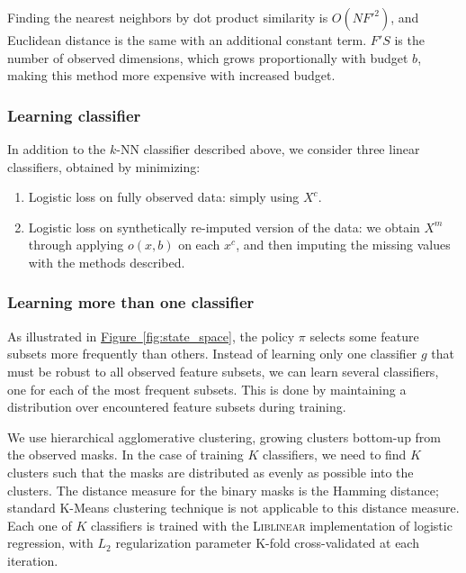 Finding the nearest neighbors by dot product similarity is $O(NF'^2)$, and Euclidean distance is the same with an additional constant term.
$F'S$ is the number of observed dimensions, which grows proportionally with budget $b$, making this method more expensive with increased budget.

\subsubsection{Learning classifier}


In addition to the $k$-NN classifier described above, we consider three linear classifiers, obtained by minimizing:
\begin{enumerate}
  \item Logistic loss on fully observed data: simply using $X^c$.
  \item Logistic loss on synthetically re-imputed version of the data: we obtain $X^m$ through applying $o(x, b)$ on each $x^c$, and then imputing the missing values with the methods described.
\end{enumerate}

\subsubsection{Learning more than one classifier}

As illustrated in \hyperref[fig:state_space]{Figure~\ref*{fig:state_space}}, the policy $\pi$ selects some feature subsets more frequently than others.
Instead of learning only one classifier $g$ that must be robust to all observed feature subsets, we can learn several classifiers, one for each of the most frequent subsets.
This is done by maintaining a distribution over encountered feature subsets during training.

We use hierarchical agglomerative clustering, growing clusters bottom-up from the observed masks.
In the case of training $K$ classifiers, we need to find $K$ clusters such that the masks are distributed as evenly as possible into the clusters.
The distance measure for the binary masks is the Hamming distance; standard K-Means clustering technique is not applicable to this distance measure.
Each one of $K$ classifiers is trained with the \textsc{Liblinear} implementation of logistic regression, with $L_2$ regularization parameter K-fold cross-validated at each iteration.

